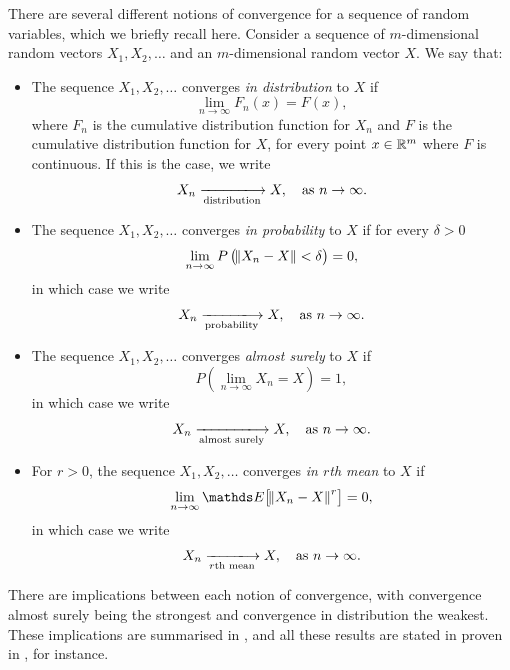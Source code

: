 There are several different notions of convergence for a sequence of random variables, which we briefly recall here.
Consider a sequence of \(m\)-dimensional random vectors \(X_1, X_2,\dotsc\) and an \(m\)-dimensional random vector \(X\).
We say that:
\begin{itemize}
	\item The sequence \(X_1, X_2, \dotsc\) converges \emph{in distribution} to \(X\) if
	      \[
		      \lim_{n\to\infty}F_n\left(x\right) = F(x),
	      \]
	      where \(F_n\) is the cumulative distribution function for \(X_n\) and \(F\) is the cumulative distribution function for \(X\), for every point \(x \in \mathbb{R}^m\) where \(F\) is continuous.
	      If this is the case, we write
	      \[
		      X_n \xlongrightarrow[\text{distribution}]{} X, \quad \text{as } n \to \infty.
	      \]


	\item The sequence \(X_1, X_2, \dotsc\) converges \emph{in probability} to \(X\) if for every \(\delta > 0\)
	      \[
		      \lim_{n\to\infty}P\left(\norm{X_n - X} < \delta\right) = 0,
	      \]
	      in which case we write
	      \[
		      X_n \xlongrightarrow[\text{probability}]{} X, \quad \text{as } n \to \infty.
	      \]

	\item The sequence \(X_1, X_2, \dotsc\) converges \emph{almost surely} to \(X\) if
	      \[
		      P\left(\lim_{n \to \infty}X_n = X\right) = 1,
	      \]
	      in which case we write
	      \[
		      X_n \xlongrightarrow[\text{almost surely}]{} X, \quad \text{as } n \to \infty.
	      \]

	\item For \(r > 0\), the sequence \(X_1, X_2, \dotsc\) converges \emph{in \(r\)th mean} to \(X\) if
	      \[
		      \lim_{n\to\infty}{\avg{\norm{X_n - X}^r}} = 0,
	      \]
	      in which case we write
	      \[
		      X_n \xlongrightarrow[r\text{th mean}]{} X, \quad \text{as } n \to \infty.
	      \]
\end{itemize}
There are implications between each notion of convergence, with convergence almost surely being the strongest and convergence in distribution the weakest.
These implications are summarised in , and all these results are stated in proven in \citet{Bremaud_2020_ProbabilityTheoryStochastic}, for instance.

